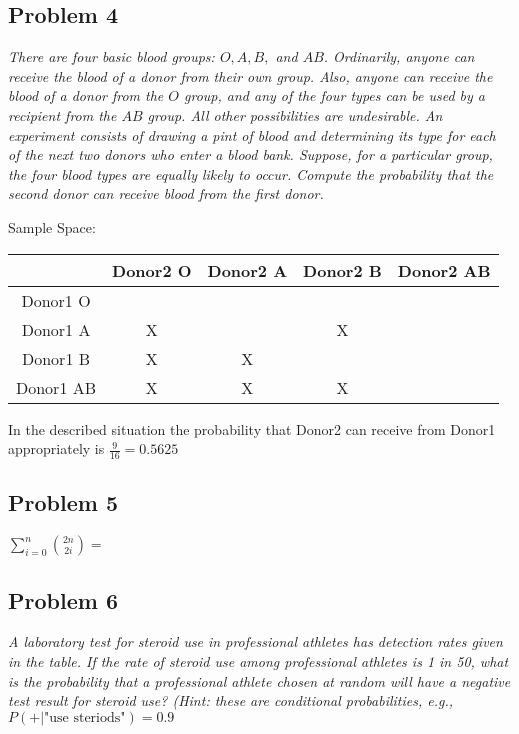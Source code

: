 \documentclass[a4paper,man,natbib]{apa6}
\begin{document}
\subsection{Problem 4}
\emph{There are four basic blood groups: $O, A, B,$ and $AB$. 
	Ordinarily, anyone can receive the blood of a donor from their own group. Also, anyone can receive the blood of a donor from the $O$ group, and any of the four types can be used by a recipient from the $AB$ group. All other possibilities are undesirable. An experiment consists of drawing a pint of blood and determining its type for each of the next two donors who enter a blood bank. Suppose, for a particular group, the four blood types are equally likely to occur. Compute the probability that the second donor can receive blood from the first donor.} \vspace{1em}

Sample Space: \\
\begin{tabular}{|c|c|c|c|c|}
	\hline
	& Donor2 O & Donor2 A & Donor2 B & Donor2 AB \\
	\hline Donor1 O   & \checkmark &  \checkmark & \checkmark  & \checkmark \\
	\hline Donor1 A   & X & \checkmark  & X & \checkmark \\
	\hline Donor1 B   & X & X & \checkmark  & \checkmark  \\
	\hline Donor1 AB & X  & X & X &  \checkmark  \\
	\hline
\end{tabular}

	In the described situation the probability that Donor2 can receive from Donor1 appropriately is
	$\frac{9}{16} = 0.5625$

\subsection{Problem 5}
\emph{  $\sum_{i=0}^{n} \binom{2n}{2i} =$  }\vspace{1em}

\subsection{Problem 6}
\emph{A laboratory test for steroid use in professional athletes has detection rates given in the table.
	If the rate of steroid use among professional athletes is 1 in 50, what is the probability that a professional athlete chosen at random will have a negative test result for steroid use? (Hint: these are conditional probabilities, e.g.,} 
	$P(+|  \text{"use steriods"} )=0.9$
\vspace{1em}
\end{document}
